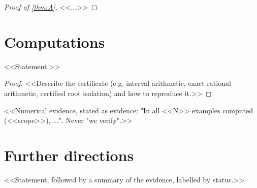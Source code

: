 \begin{proof}[Proof of \cref{thm:A}]
<<...>>
\end{proof}

\section{Computations}\label{sec:computations}

\begin{proposition}\label{prop:certified}
<<Statement.>>
\end{proposition}

\begin{proof}
<<Describe the certificate (e.g. interval arithmetic, exact rational
arithmetic, certified root isolation) and how to reproduce it.>>
\end{proof}

\begin{observation}\label{obs:numerical}
<<Numerical evidence, stated as evidence: "In all <<N>> examples computed
(<<scope>>), ...". Never "we verify".>>
\end{observation}


\section{Further directions}\label{sec:further}

\begin{conjecture}\label{conj:main}
<<Statement, followed by a summary of the evidence, labelled by status.>>
\end{conjecture}

